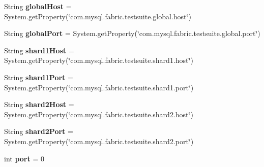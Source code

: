 \begin{DoxyCompactItemize}
\item 
\mbox{\label{classtestsuite_1_1fabric_1_1_base_fabric_test_case_a26f62a903652e3ad840146a6ede1c181}} 
String {\bfseries global\+Host} = System.\+get\+Property(\char`\"{}com.\+mysql.\+fabric.\+testsuite.\+global.\+host\char`\"{})
\item 
\mbox{\label{classtestsuite_1_1fabric_1_1_base_fabric_test_case_a48d9c36c5bc30dec5933d62da5b102a0}} 
String {\bfseries global\+Port} = System.\+get\+Property(\char`\"{}com.\+mysql.\+fabric.\+testsuite.\+global.\+port\char`\"{})
\item 
\mbox{\label{classtestsuite_1_1fabric_1_1_base_fabric_test_case_af89bfa7bc992778d2a9f46431e258734}} 
String {\bfseries shard1\+Host} = System.\+get\+Property(\char`\"{}com.\+mysql.\+fabric.\+testsuite.\+shard1.\+host\char`\"{})
\item 
\mbox{\label{classtestsuite_1_1fabric_1_1_base_fabric_test_case_a11617e61401c406dac6c19906da57b66}} 
String {\bfseries shard1\+Port} = System.\+get\+Property(\char`\"{}com.\+mysql.\+fabric.\+testsuite.\+shard1.\+port\char`\"{})
\item 
\mbox{\label{classtestsuite_1_1fabric_1_1_base_fabric_test_case_a0a90e557ecf4ac786b426817ed2b0949}} 
String {\bfseries shard2\+Host} = System.\+get\+Property(\char`\"{}com.\+mysql.\+fabric.\+testsuite.\+shard2.\+host\char`\"{})
\item 
\mbox{\label{classtestsuite_1_1fabric_1_1_base_fabric_test_case_a5e0e32b173e8559eccbdadf724c4d1ce}} 
String {\bfseries shard2\+Port} = System.\+get\+Property(\char`\"{}com.\+mysql.\+fabric.\+testsuite.\+shard2.\+port\char`\"{})
\item 
\mbox{\label{classtestsuite_1_1fabric_1_1_base_fabric_test_case_ab20399c40d5ac47ef8e70eedcfda7a43}} 
int {\bfseries port} = 0
\item 
\mbox{\label{classtestsuite_1_1fabric_1_1_base_fabric_test_case_ad4ed3c1536362ec745dc1281fd91b8a0}} 

\end{DoxyCompactItemize}
